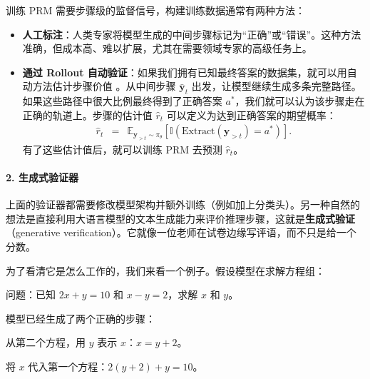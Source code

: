 训练 PRM 需要步骤级的监督信号，构建训练数据通常有两种方法：

\begin{itemize}
\item \textbf{人工标注}：人类专家将模型生成的中间步骤标记为“正确”或“错误”。这种方法准确，但成本高、难以扩展，尤其在需要领域专家的高级任务上。
\item \textbf{通过 Rollout 自动验证}：如果我们拥有已知最终答案的数据集，就可以用自动方法估计步骤价值 \cite{wang-etal:2024math}。从中间步骤 $\bar{\mathbf{y}}_t$ 出发，让模型继续生成多条完整路径。如果这些路径中很大比例最终得到了正确答案 $a^*$，我们就可以认为该步骤走在正确的轨道上。步骤的估计值 $\hat{r}_t$ 可以定义为达到正确答案的期望概率：
    \begin{eqnarray}
    \hat{r}_t & = & \mathbb{E}_{\mathbf{y}_{>t} \sim \pi_\theta} [ \mathbb{I}(\mathrm{Extract}(\mathbf{y}_{>t}) = a^*) ].
    \end{eqnarray}
    有了这些估计值后，就可以训练 PRM 去预测 $\hat{r}_t$。
\end{itemize}

\paragraph{2. 生成式验证器}

上面的验证器都需要修改模型架构并额外训练（例如加上分类头）。另一种自然的想法是直接利用大语言模型的文本生成能力来评价推理步骤，这就是\textbf{生成式验证}（generative verification）\cite{zheng-etal:2023judging}。它就像一位老师在试卷边缘写评语，而不只是给一个分数。

为了看清它是怎么工作的，我们来看一个例子。假设模型在求解方程组：
\vspace{0.5em}

\begin{tcolorbox}[
    frame empty,
    colback=black!5,
    coltext=black
]

问题：已知 $2x + y = 10$ 和 $x - y = 2$，求解 $x$ 和 $y$。

\end{tcolorbox}

\vspace{0.5em}

模型已经生成了两个正确的步骤：
\vspace{0.5em}

\begin{tcolorbox}[
    frame empty,
    colback=black!5,
    coltext=black
]

从第二个方程，用 $y$ 表示 $x$：$x = y + 2$。

将 $x$ 代入第一个方程：$2(y + 2) + y = 10$。

\end{tcolorbox}

